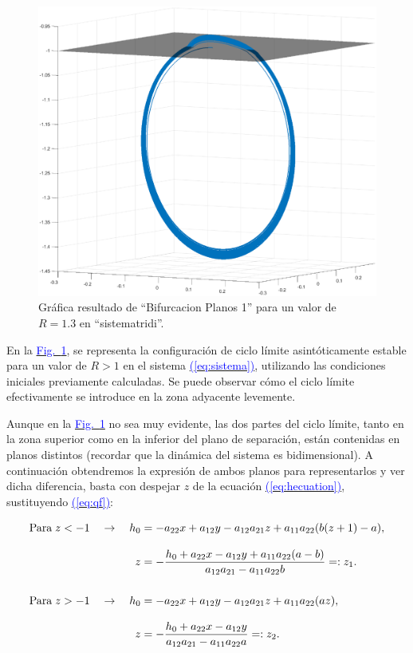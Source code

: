 \documentclass[12pt,a4paper]{report} %
\newcommand{\fref}[1]{\hyperref[#1]{\textcolor{blue}{Fig.~\ref*{#1}}}}
\newcommand{\eref}[1]{\hyperref[#1]{\textcolor{blue}{(\ref*{#1})}}}
\newcommand{\fref}[1]{\hyperref[#1]{\textcolor{blue}{\textit{Fig.~\ref*{#1}}}}}
\newcommand{\eref}[1]{\hyperref[#1]{\textcolor{blue}{\textit{(\ref*{#1})}}}}
\begin{document}
	\begin{figure}[h]
		\centering
		\includegraphics[width=1\textwidth]{ciclocir.eps}
		\caption{Gráfica resultado de ``Bifurcacion Planos 1'' para un valor de $R=1.3$ en ``sistematridi''.}
		\label{fig:ciclocircuito}
	\end{figure}\smallskip
	
		\vspace{0.5cm}\noindent En la \fref{fig:ciclocircuito}, se representa la configuración de ciclo límite asintóticamente estable para un valor de $R>1$ en el sistema \eref{eq:sistema}, utilizando las condiciones iniciales previamente calculadas. Se puede observar cómo el ciclo límite efectivamente se introduce en la zona adyacente levemente.
		
		\newpage
		
	Aunque en la \fref{fig:ciclocircuito} no sea muy evidente, las dos partes del ciclo límite, tanto en la zona superior como en la inferior del plano de separación, están contenidas en planos distintos (recordar que la dinámica del sistema es bidimensional). A continuación obtendremos la expresión de ambos planos para representarlos y ver dicha diferencia, basta con despejar $z$ de la ecuación \eref{eq:hecuation}, sustituyendo \eref{eq:qf}:
		
		\begin{subequations}
			\label{eq:funcz}
			\begin{align}
				\text{Para}\; z<-1 \quad \rightarrow \quad h_0&=-a_{22}x+a_{12}y-a_{12}a_{21}z+a_{11}a_{22}(b(z+1)-a),\notag\\[3mm]
				z&=-\frac{h_0+a_{22}x-a_{12}y+a_{11}a_{22}(a-b)}{a_{12}a_{21}-a_{11}a_{22}b}=:z_1. \label{eq:z1} \\[5mm]
				\text{Para}\; z>-1 \quad \rightarrow \quad h_0&=-a_{22}x+a_{12}y-a_{12}a_{21}z+a_{11}a_{22}(az),\notag\\[3mm]
				z&=-\frac{h_0+a_{22}x-a_{12}y}{a_{12}a_{21}-a_{11}a_{22}a}=:z_2. \label{eq:z2}
			\end{align}
		\end{subequations}
		
\end{document}
